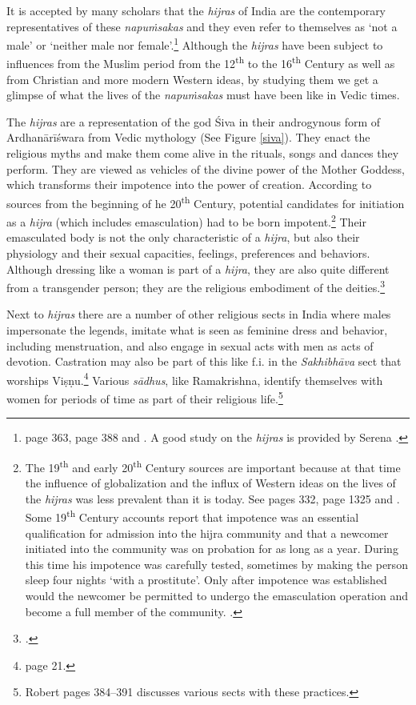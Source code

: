 It is accepted by many scholars that the \textit{hijras} of India are the contemporary representatives of these \textit{napuṁsakas} and they even refer to themselves as `not a male' or `neither male nor female'.\footnote{\cite{zwilling} page 363, \cite{goldman} page 388 and \cite{wendy}. A good study on the \textit{hijras} is provided by Serena \cite{nanda}.} Although the \textit{hijras} have been subject to influences from the Muslim period from the 12\textsuperscript{th} to the 16\textsuperscript{th} Century as well as from Christian and more modern Western ideas, by studying them we get a glimpse of what the lives of the \textit{napuṁsakas} must have been like in Vedic times. 

The \textit{hijras} are a representation of the god Śiva in their androgynous form of Ardhanārīśwara from Vedic mythology (See Figure \ref{siva}). They enact the religious myths and make them come alive in the rituals, songs and dances they perform. They are viewed as vehicles of the divine power of the Mother Goddess, which transforms their impotence into the power of creation. According to sources from the beginning of he 20\textsuperscript{th} Century, potential candidates for initiation as a \textit{hijra} (which includes emasculation) had to be born impotent.\footnote{The 19\textsuperscript{th} and early 20\textsuperscript{th} Century sources are important because at that time the influence of globalization and the influx of Western ideas on the lives of the \textit{hijras} was less prevalent than it is today. See \cite{ibbetson} pages 332, \cite{shah} page 1325 and \cite{bhimbhai}. Some 19\textsuperscript{th} Century accounts report that impotence was an essential qualification for admission into the hijra community and that a newcomer initiated into the community was on probation for as long as a year. During this time his impotence was carefully tested, sometimes by making the person sleep four nights `with a prostitute'. Only after impotence was established would the newcomer be permitted to undergo the emasculation operation and become a full member of the community. \cite{preston}.} Their emasculated body is not the only characteristic of a \textit{hijra}, but also their physiology and their sexual capacities, feelings, preferences and behaviors. Although dressing like a woman is part of a \textit{hijra}, they are also quite different from a transgender person; they are the religious embodiment of the deities.\footnote{\cite{nanda}.}

Next to \textit{hijras} there are a number of other religious sects in India where males impersonate the legends, imitate what is seen as feminine dress and behavior, including menstruation, and also engage in sexual acts with men as acts of devotion. Castration may also be part of this like f.i. in the \textit{Sakhibhāva} sect that worships Viṣṇu.\footnote{\cite{nanda} page 21.} Various \textit{sādhus}, like Ramakrishna, identify themselves with women for periods of time as part of their religious life.\footnote{Robert \cite{goldman} pages 384–391 discusses various sects with these practices.} 

